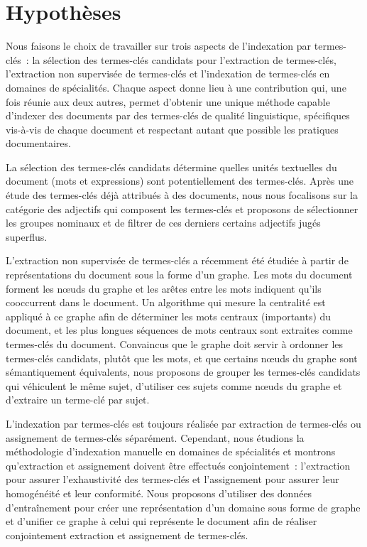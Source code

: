
  \section{Hypothèses}
  \label{sec:main-introduction-hypothesis}
    Nous faisons le choix de travailler sur trois aspects de l'indexation par
    termes-clés~: la sélection des termes-clés candidats pour l'extraction de
    termes-clés, l'extraction non supervisée de termes-clés et l'indexation de
    termes-clés en domaines de spécialités. Chaque aspect donne lieu à une
    contribution qui, une fois réunie aux deux autres, permet d'obtenir une
    unique méthode capable d'indexer des documents par des termes-clés de
    qualité linguistique, spécifiques vis-à-vis de chaque document et respectant
    autant que possible les pratiques documentaires.

    La sélection des termes-clés candidats détermine quelles unités textuelles
    du document (mots et expressions) sont potentiellement des termes-clés.
    Après une étude des termes-clés déjà attribués à des documents, nous nous
    focalisons sur la catégorie des adjectifs qui composent les termes-clés et
    proposons de sélectionner les groupes nominaux et de filtrer de ces derniers
    certains adjectifs jugés superflus.

    L'extraction non supervisée de termes-clés a récemment été étudiée à partir
    de représentations du document sous la forme d'un graphe. Les mots du
    document forment les n\oe{}uds du graphe et les arêtes entre les mots
    indiquent qu'ils cooccurrent dans le document. Un algorithme qui mesure la
    centralité est appliqué à ce graphe afin de déterminer les mots centraux
    (importants) du document, et les plus longues séquences de mots centraux
    sont extraites comme termes-clés du document. Convaincus que le graphe doit
    servir à ordonner les termes-clés candidats, plutôt que les mots, et que
    certains n\oe{}uds du graphe sont sémantiquement équivalents, nous proposons
    de grouper les termes-clés candidats qui véhiculent le même sujet,
    d'utiliser ces sujets comme n\oe{}uds du graphe et d'extraire un terme-clé
    par sujet.
    
    L'indexation par termes-clés est toujours réalisée par extraction de
    termes-clés ou assignement de termes-clés séparément. Cependant, nous
    étudions la méthodologie d'indexation manuelle en domaines de spécialités et
    montrons qu'extraction et assignement doivent être effectués conjointement~:
    l'extraction pour assurer l'exhaustivité des termes-clés et l'assignement
    pour assurer leur homogénéité et leur conformité. Nous proposons d'utiliser
    des données d'entraînement pour créer une représentation d'un domaine sous
    forme de graphe et d'unifier ce graphe à celui qui représente le document
    afin de réaliser conjointement extraction et assignement de termes-clés.

